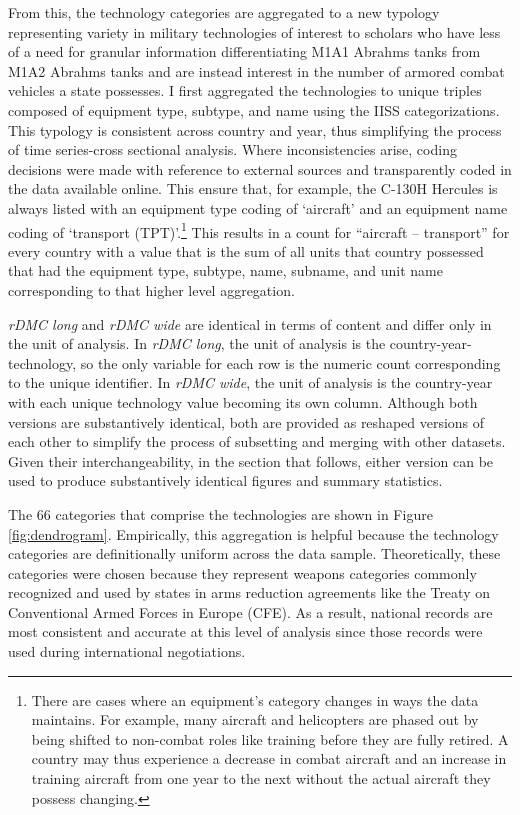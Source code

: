 \documentclass[
]{article}
\begin{document}
From this, the technology categories are aggregated to a new typology representing variety in military technologies of interest to scholars who have less of a need for granular information differentiating M1A1 Abrahms tanks from M1A2 Abrahms tanks and are instead interest in the number of armored combat vehicles a state possesses. I first aggregated the technologies to unique triples composed of equipment type, subtype, and name using the IISS categorizations. This typology is consistent across country and year, thus simplifying the process of time series-cross sectional analysis. Where inconsistencies arise, coding decisions were made with reference to external sources and transparently coded in the data available online. This ensure that, for example, the C-130H Hercules is always listed with an equipment type coding of `aircraft' and an equipment name coding of `transport (TPT)'.\footnote{There are cases where an equipment's category changes in ways the data maintains. For example, many aircraft and helicopters are phased out by being shifted to non-combat roles like training before they are fully retired. A country may thus experience a decrease in combat aircraft and an increase in training aircraft from one year to the next without the actual aircraft they possess changing.} This results in a count for ``aircraft -- transport'' for every country with a value that is the sum of all units that country possessed that had the equipment type, subtype, name, subname, and unit name corresponding to that higher level aggregation.

\textit{rDMC long} and \textit{rDMC wide} are identical in terms of content and differ only in the unit of analysis. In \textit{rDMC long}, the unit of analysis is the country-year-technology, so the only variable for each row is the numeric count corresponding to the unique identifier. In \textit{rDMC wide}, the unit of analysis is the country-year with each unique technology value becoming its own column. Although both versions are substantively identical, both are provided as reshaped versions of each other to simplify the process of subsetting and merging with other datasets. Given their interchangeability, in the section that follows, either version can be used to produce substantively identical figures and summary statistics.

The 66 categories that comprise the technologies are shown in Figure \ref{fig:dendrogram}. Empirically, this aggregation is helpful because the technology categories are definitionally uniform across the data sample. Theoretically, these categories were chosen because they represent weapons categories commonly recognized and used by states in arms reduction agreements like the Treaty on Conventional Armed Forces in Europe (CFE). As a result, national records are most consistent and accurate at this level of analysis since those records were used during international negotiations.
\end{document}
